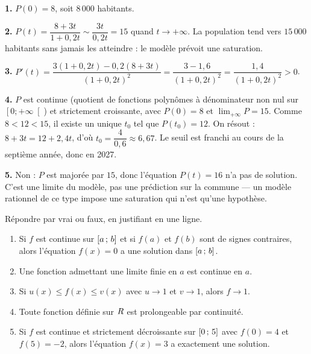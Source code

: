 \begin{corrige}
\textbf{1.} $P(0) = 8$, soit $8\,000$ habitants.

\textbf{2.} $P(t) = \dfrac{8+3t}{1+0{,}2t} \sim \dfrac{3t}{0{,}2t} = 15$ quand
$t \to +\infty$. La population tend vers $15\,000$ habitants sans jamais les
atteindre : le modèle prévoit une saturation.

\textbf{3.} $P'(t) = \dfrac{3(1+0{,}2t) - 0{,}2(8+3t)}{(1+0{,}2t)^{2}}
= \dfrac{3 - 1{,}6}{(1+0{,}2t)^{2}} = \dfrac{1{,}4}{(1+0{,}2t)^{2}} > 0$.

\textbf{4.} $P$ est continue (quotient de fonctions polynômes à dénominateur
non nul sur $\left[0 ; +\infty\right[$) et strictement croissante, avec
$P(0) = 8$ et $\lim_{+\infty} P = 15$. Comme $8 < 12 < 15$, il existe un
unique $t_{0}$ tel que $P(t_{0}) = 12$. On résout :
$8 + 3t = 12 + 2{,}4t$, d'où $t_{0} = \dfrac{4}{0{,}6} \approx 6{,}67$. Le seuil
est franchi au cours de la septième année, donc en 2027.

\textbf{5.} Non : $P$ est majorée par $15$, donc l'équation $P(t) = 16$ n'a
pas de solution. C'est une limite du modèle, pas une prédiction sur la
commune — un modèle rationnel de ce type impose une saturation qui n'est
qu'une hypothèse.
\end{corrige}

\begin{jemeteste}
Répondre par vrai ou faux, en justifiant en une ligne.

\begin{enumerate}[label=\textbf{\arabic*.}, leftmargin=*, itemsep=0.28em]
  \item Si $f$ est continue sur $\left[a\,;\,b\right]$ et si $f(a)$ et $f(b)$
        sont de signes contraires, alors l'équation $f(x) = 0$ a une solution
        dans $\left[a\,;\,b\right]$.
  \item Une fonction admettant une limite finie en $a$ est continue en $a$.
  \item Si $u(x) \leq f(x) \leq v(x)$ avec $u \to 1$ et $v \to 1$, alors
        $f \to 1$.
  \item Toute fonction définie sur $R$ est prolongeable par continuité.
  \item Si $f$ est continue et strictement décroissante sur
        $\left[0\,;\,5\right]$ avec $f(0) = 4$ et $f(5) = -2$, alors l'équation
        $f(x) = 3$ a exactement une solution.
\end{enumerate}
\end{jemeteste}

